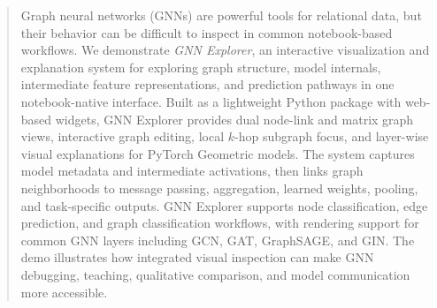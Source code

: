 \begin{abstract}
Graph neural networks (GNNs) are powerful tools for relational data, but their behavior can be difficult to inspect in common notebook-based workflows. We demonstrate \textit{GNN Explorer}, an interactive visualization and explanation system for exploring graph structure, model internals, intermediate feature representations, and prediction pathways in one notebook-native interface. Built as a lightweight Python package with web-based widgets, GNN Explorer provides dual node-link and matrix graph views, interactive graph editing, local $k$-hop subgraph focus, and layer-wise visual explanations for PyTorch Geometric models. The system captures model metadata and intermediate activations, then links graph neighborhoods to message passing, aggregation, learned weights, pooling, and task-specific outputs. GNN Explorer supports node classification, edge prediction, and graph classification workflows, with rendering support for common GNN layers including GCN, GAT, GraphSAGE, and GIN. The demo illustrates how integrated visual inspection can make GNN debugging, teaching, qualitative comparison, and model communication more accessible.
\end{abstract}
